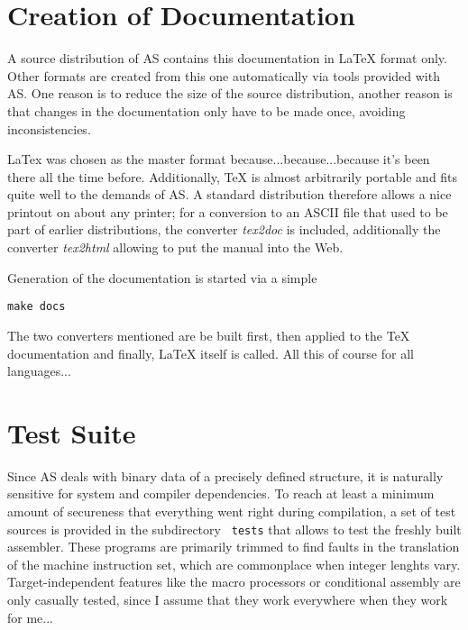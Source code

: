 \documentclass[12pt,twoside]{report}
\newcommand{\asname}{{AS}}
\begin{document}

\section{Creation of Documentation}

A source distribution of \asname{} contains this documentation in LaTeX format
only.  Other formats are created from this one automatically  via tools
provided with \asname{}.  One reason is to reduce the size of the source
distribution, another reason is that changes in the documentation only
have to be made once, avoiding inconsistencies.

LaTex was chosen as the master format because...because...because it's
been there all the time before.  Additionally, TeX is almost arbitrarily
portable and fits quite well to the demands of \asname{}.  A standard
distribution therefore allows a nice printout on about any printer; for a
conversion to an ASCII file that used to be part of earlier distributions,
the converter {\em tex2doc} is included, additionally the converter {\em
tex2html} allowing to put the manual into the Web.

Generation of the documentation is started via a simple
\begin{verbatim}
make docs
\end{verbatim}
The two converters mentioned are be built first, then applied to the TeX
documentation and finally, LaTeX itself is called.  All this of course for
all languages...


\section{Test Suite}

Since \asname{} deals with binary data of a precisely defined structure, it is
naturally sensitive for system and compiler dependencies.  To reach at
least a minimum amount of secureness that everything went right during
compilation, a set of test sources is provided in the subdirectory {\tt
tests} that allows to test the freshly built assembler.  These programs
are primarily trimmed to find faults in the translation of the machine
instruction set, which are commonplace when integer lenghts vary.
Target-independent features like the macro processors or conditional
assembly are only casually tested, since I assume that they work
everywhere when they work for me...
\end{document}
